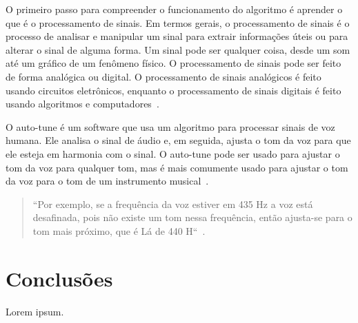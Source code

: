 \documentclass{sbrt}
\begin{document}
O primeiro passo para compreender o funcionamento do algoritmo é aprender o que é o processamento de sinais. Em termos
gerais, o processamento de sinais é o processo de analisar e manipular um sinal para extrair informações úteis ou para
alterar o sinal de alguma forma. Um sinal pode ser qualquer coisa, desde um som até um gráfico de um fenômeno físico. O
processamento de sinais pode ser feito de forma analógica ou digital. O processamento de sinais analógicos é feito
usando circuitos eletrônicos, enquanto o processamento de sinais digitais é feito usando algoritmos e
computadores~\cite{prandoni2008signal}.

O auto-tune é um software que usa um algoritmo para processar sinais de voz humana. Ele analisa o sinal de áudio e, em
seguida, ajusta o tom da voz para que ele esteja em harmonia com o sinal. O auto-tune pode ser usado para ajustar o tom
da voz para qualquer tom, mas é mais comumente usado para ajustar o tom da voz para o tom de um instrumento
musical~\cite{browning2014auto}.

\begin{quote} ``Por exemplo, se a frequência da voz estiver em 435 Hz a voz está desafinada, pois não existe um tom
nessa frequência, então ajusta-se para o tom mais próximo, que é Lá de 440 H``~\cite{deimplementaccao}. \end{quote}


\section{Conclusões}

Lorem ipsum.





\end{document}
